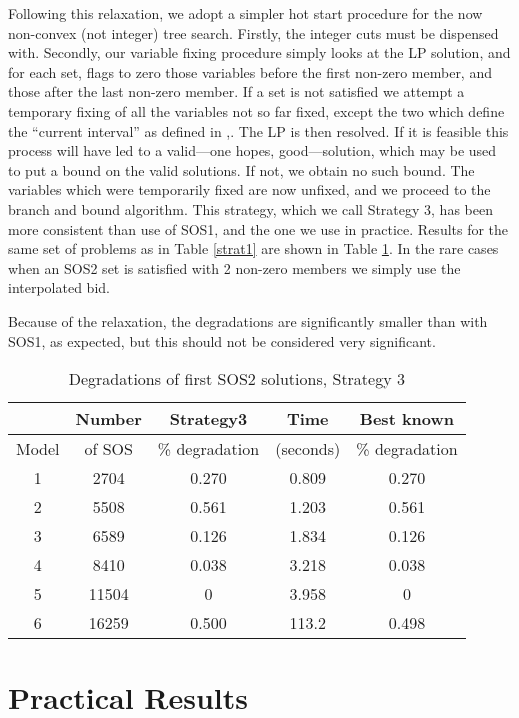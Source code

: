 \documentclass[finalversion,simpleeqnnos]{yrl}
\begin{document}
Following this relaxation, we adopt a simpler hot start procedure for the now non-convex (not integer) tree search. Firstly, the integer cuts must be dispensed with. Secondly, our variable fixing procedure simply looks at the LP solution, and for each set, flags to zero those variables before the first non-zero member, and those after the last non-zero member. If a set is not satisfied we attempt a temporary fixing of all the variables not so far fixed, except the two which define the ``current interval'' as defined in \cite{SOS},\cite{F-T}. The LP is then resolved. If it is feasible this process will have led to a valid---one hopes, good---solution, which may be used to put a bound on the valid solutions. If not, we obtain no such bound. The variables which were temporarily fixed are now unfixed, and we proceed to the branch and bound algorithm.
This strategy, which we call Strategy 3, has been more consistent than use of SOS1, and the one we use in practice. Results for the same set of problems as in Table \ref{strat1} are shown in Table \ref{strat3}. In the rare cases when an SOS2 set is satisfied with 2 non-zero members we simply use the interpolated bid.

Because of the relaxation, the degradations are significantly smaller than with SOS1, as expected, but this should not be considered very significant.

\begin{table}[htbp]
\begin{centering}
\begin{tabular}{|| c | c | c | c | c ||}
\hline
 & Number & Strategy3 & Time & Best known \\ \hline
Model & of SOS &\% degradation & (seconds) & \% degradation \\ \hline
1 & 2704 & 0.270 & 0.809 & 0.270 \\ \hline
2 & 5508 & 0.561 & 1.203 & 0.561 \\ \hline 
3 & 6589 & 0.126 & 1.834 & 0.126 \\ \hline 
4 & 8410 & 0.038 & 3.218 & 0.038 \\ \hline 
5 & 11504 & 0 & 3.958 & 0 \\ \hline 
6 & 16259 & 0.500 & 113.2 & 0.498 \\ \hline 
\end{tabular}
\caption{Degradations of first SOS2 solutions, Strategy 3}
\label{strat3}
\end{centering}
\end{table}


\section{Practical Results}\label{pract}
\end{document}
